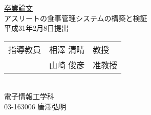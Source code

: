\begin{titlepage}
	\centering
	\vspace*{2cm}
	{\Huge \underline{卒業論文}} \\
	\vspace*{2cm}
	{\Huge アスリートの食事管理システムの構築と検証} \\
	\vspace*{2cm}
	{\LARGE 平成31年2月8日提出} \\
	\vspace*{2cm}
	{\LARGE
		\begin{tabular}{lll}
			指導教員 & 相澤 清晴 & 教授\\
			 &山崎 俊彦 & 准教授 \\
		\end{tabular}
	} \\
	\vspace*{2cm}
	{\LARGE 電子情報工学科} \\
	\vspace*{0.5cm}
	{\LARGE 03-163006 唐澤弘明} \\
\end{titlepage}
